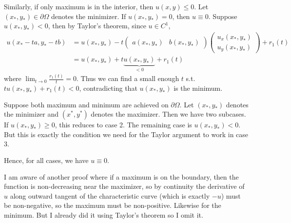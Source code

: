 \documentclass[12pt]{article}
\begin{document}
\begin{problem}[4]
\begin{case}[3]
Similarly, if only maximum is in the interior, then $ u(x,y) \leq 0$. Let  $ (x_* ,y_* ) \in \partial \Omega$ denotes the minimizer. If $ u(x_* ,y_* ) = 0$, then $ u \equiv 0$. Suppose  $ u(x_* ,y_* )<0$, then by Taylor's theorem, since $ u \in C^{1}$,
\begin{align*}
	u(x_* -ta,y_* -tb) &= u(x_* ,y_* )-t \begin{pmatrix} a(x_* ,y_* ) & b(x_* ,y_* )\end{pmatrix} \begin{pmatrix} u_x(x_* ,y_* ) \\u_y(x_* ,y_* )\end{pmatrix} + r_1(t) \\
	&= u(x_* ,y_* ) + t \underbrace{ u(x_* ,y_* )}_{<0 }  + r_1(t)
\end{align*}
where $ \lim_{ t \to 0}  \frac{r_1(t)}{t } = 0$. Thus we can find a small enough $ t$  s.t.\ $ tu(x_* ,y_* )+r_1(t) <0$, contradicting that $ u(x_* ,y_* )$ is the minimum.
\end{case}
\begin{case}[4]
Suppose both maximum and minimum are achieved on $ \partial \Omega$. Let $ (x_* ,y_* )$ denotes the minimizer and $ (x^* ,y^* )$ denotes the maximizer. Then we have two subcases. If $ u(x_* ,y_* ) \geq 0$, this reduces to case 2. The remaining case is $u(x_*,y_*) <0$. But this is exactly the condition we need for the Taylor argument to work in case 3.
\end{case}
Hence, for all cases, we have $ u \equiv 0$.

I am aware of another proof where if a maximum is on the boundary, then the function is non-decreasing near the maximizer, so by continuity the derivative of $ u$ along outward tangent of the characteristic curve (which is exactly $ -u$) must be non-negative, so the maximum must be non-positive. Likewise for the minimum. But I already did it using Taylor's theorem so I omit it.
\end{problem}
\end{document}
